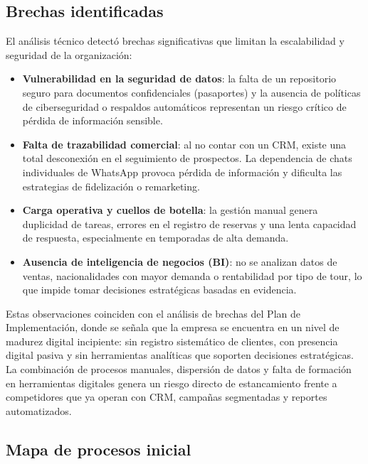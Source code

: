 \subsection{Brechas identificadas}

\begin{indentedsubsection}
El análisis técnico detectó brechas significativas que limitan la escalabilidad y seguridad de la organización:

\begin{itemize}
    \item[a.] \textbf{Vulnerabilidad en la seguridad de datos}: la falta de un repositorio seguro para documentos confidenciales (pasaportes) y la ausencia de políticas de ciberseguridad o respaldos automáticos representan un riesgo crítico de pérdida de información sensible.
    \item[b.] \textbf{Falta de trazabilidad comercial}: al no contar con un CRM, existe una total desconexión en el seguimiento de prospectos. La dependencia de chats individuales de WhatsApp provoca pérdida de información y dificulta las estrategias de fidelización o remarketing.
    \item[c.] \textbf{Carga operativa y cuellos de botella}: la gestión manual genera duplicidad de tareas, errores en el registro de reservas y una lenta capacidad de respuesta, especialmente en temporadas de alta demanda.
    \item[d.] \textbf{Ausencia de inteligencia de negocios (BI)}: no se analizan datos de ventas, nacionalidades con mayor demanda o rentabilidad por tipo de tour, lo que impide tomar decisiones estratégicas basadas en evidencia.
\end{itemize}

Estas observaciones coinciden con el análisis de brechas del Plan de Implementación, donde se señala que la empresa se encuentra en un nivel de madurez digital incipiente: sin registro sistemático de clientes, con presencia digital pasiva y sin herramientas analíticas que soporten decisiones estratégicas. La combinación de procesos manuales, dispersión de datos y falta de formación en herramientas digitales genera un riesgo directo de estancamiento frente a competidores que ya operan con CRM, campañas segmentadas y reportes automatizados.

\end{indentedsubsection}

\subsection{Mapa de procesos inicial}

